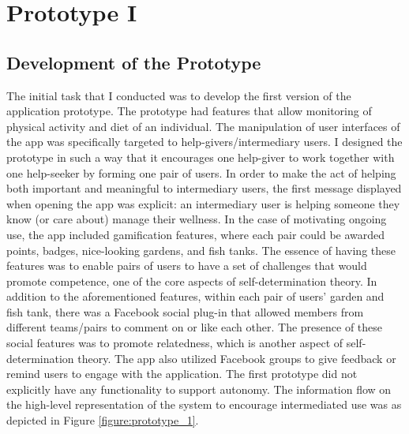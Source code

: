 
\chapter{Prototype I} %

\label{prototype1chapter} %

\section{Development of the Prototype}
The initial task that I conducted was to develop the first version of the application prototype. The prototype had features that allow monitoring of physical activity and diet of an individual. The manipulation of user interfaces of the app was specifically targeted to help-givers/intermediary users. I designed the prototype in such a way that it encourages one help-giver to work together with one help-seeker by forming one pair of users. In order to make the act of helping both important and meaningful to intermediary users, the first message displayed when opening the app was explicit: an intermediary user is helping someone they know (or care about) manage their wellness. In the case of motivating ongoing use, the app included gamification features, where each pair could be awarded points, badges, nice-looking gardens, and fish tanks. The essence of having these features was to enable pairs of users to have a set of challenges that would promote competence, one of the core aspects of self-determination theory. In addition to the aforementioned features, within each pair of users' garden and fish tank, there was a Facebook social plug-in that allowed members from different teams/pairs to comment on or like each other. The presence of these social features was to promote relatedness, which is another aspect of self-determination theory. The app also utilized Facebook groups to give feedback or remind users to engage with the application. The first prototype did not explicitly have any functionality to support autonomy. The information flow on the high-level representation of the system to encourage intermediated use was as depicted in Figure \ref{figure:prototype_1}. 

